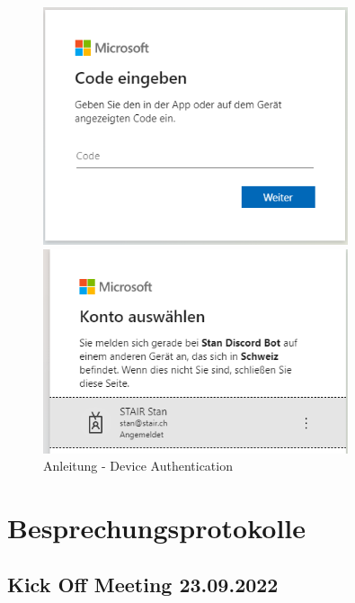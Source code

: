 \documentclass[a4paper, table]{article}
\begin{document}
\begin{figure}[h]
    \begin{minipage}[t]{0.5\textwidth}
        \includegraphics[width=0.8\textwidth]{img/Tut_deviceAuthLogin.png}
    \end{minipage}
    \begin{minipage}[t]{0.5\textwidth}
        \includegraphics[width=0.8\textwidth]{img/Tut_deviceAuthAccount.png}
    \end{minipage}
    \caption{Anleitung - Device Authentication}
    \label{fig:tutorial-device-auth}
\end{figure}

\newpage
\section{Besprechungsprotokolle}

\subsection{Kick Off Meeting 23.09.2022}
\end{document}
